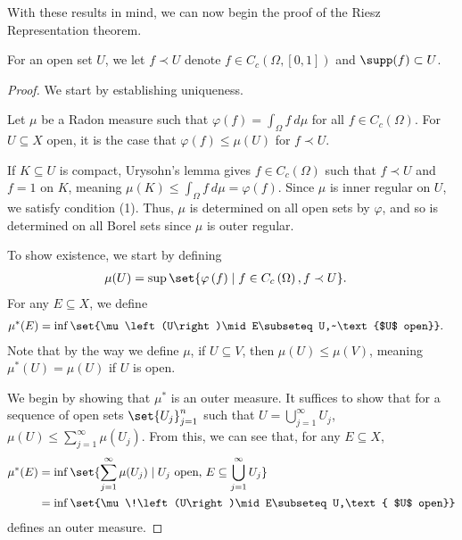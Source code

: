 \documentclass[10pt]{mypackage}
\begin{document}
With these results in mind, we can now begin the proof of the Riesz Representation theorem.
\begin{notation}
  For an open set $U$, we let $f\prec U$ denote $f\in C_c\left(\Omega,[0,1]\right)$ and $\supp(f) \subset U$.
\end{notation}
\begin{proof}
  We start by establishing uniqueness.\newline

  Let $\mu$ be a Radon measure such that $\varphi(f) = \int_{\Omega}f\:d\mu$ for all $f\in C_c\left(\Omega\right)$. For $U\subseteq X$ open, it is the case that $\varphi(f) \leq \mu\!\left(U\right)$ for $f\prec U$.\newline

  If $K\subseteq U$ is compact, Urysohn's lemma gives $f\in C_c\left(\Omega\right)$ such that $f\prec U$ and $f = 1$ on $K$, meaning $\mu\!\left(K\right) \leq \int_{\Omega}f\:d\mu = \varphi(f)$. Since $\mu$ is inner regular on $U$, we satisfy condition (1). Thus, $\mu$ is determined on all open sets by $\varphi$, and so is determined on all Borel sets since $\mu$ is outer regular.\newline

  To show existence, we start by defining
  \begin{align*}
    \mu\!\left(U\right) &=\sup\set{\varphi\left(f\right)\mid f\in C_c\left(\Omega\right),f\prec U}.
  \end{align*}
  For any $E\subseteq X$, we define
  \begin{align*}
    \mu^{\ast}\!\left(E\right) &= \inf\set{\mu\left(U\right)\mid E\subseteq U,~\text{$U$ open}}.
  \end{align*}
  Note that by the way we define $\mu$, if $U\subseteq V$, then $\mu\!\left(U\right) \leq \mu\!\left(V\right)$, meaning $\mu^{\ast}\!\left(U\right) = \mu\!\left(U\right)$ if $U$ is open.\newline

  We begin by showing that $\mu^{\ast}$ is an outer measure. It suffices to show that for a sequence of open sets $\set{U_j}_{j=1}^{n}$ such that $U = \bigcup_{j=1}^{\infty}U_j$, $\mu\!\left(U\right) \leq \sum_{j=1}^{\infty}\mu\!\left(U_j\right)$. From this, we can see that, for any $E\subseteq X$,
  \begin{align*}
    \mu^{\ast}\!\left(E\right) &= \inf\set{\sum_{j=1}^{\infty}\mu\!\left(U_j\right)\mid U_j\text{ open, }E\subseteq \bigcup_{j=1}^{\infty}U_j}\\
                               &= \inf\set{\mu\!\left(U\right)\mid E\subseteq U,\text{ $U$ open}}
  \end{align*}
  defines an outer measure.\newline


\end{proof}
\end{document}
